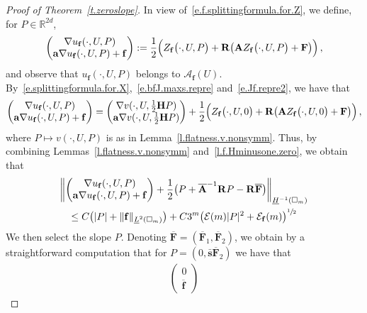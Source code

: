 \documentclass[11pt]{article} %
\let\oldsquare\square %
\renewcommand{\square}{\oldsquare}
\numberwithin{equation}{section}
\theoremstyle{definition}
\newcommand*{\R}{\ensuremath{\mathbb{R}}}
\newcommand{\f}{\mathbf{f}}
\renewcommand{\a}{\mathbf{a}}
\newcommand{\shom}{\bar{\mathbf{s}}}
\newcommand{\cu}{\square}
\newcommand{\bfA}{\mathbf{A}}
\newcommand{\bfF}{\mathbf{F}}
\newcommand{\rota}{\mathbf{R}}
\newcommand{\refl}{\mathbf{H}}
\begin{document}
\begin{proof}[{Proof of Theorem~\ref{t.zeroslope}}]
In view of~\eqref{e.f.splittingformula.for.Z}, we define, for $P\in \R^{2d}$, 
\begin{align*}  
\begin{pmatrix} \nabla u_\f(\cdot,U,P)  \\ \a \nabla u_\f(\cdot,U,P) + \f \end{pmatrix}  
:=
\frac12 \Bigl( Z_\f\bigl(\cdot,U,P \bigr) + \rota \bigl( \bfA Z_\f\bigl (\cdot,U,P \bigr) + \bfF\bigr) \Bigr) \,,
\end{align*}
and observe that $u_\f(\cdot,U,P)$ belongs to $\mathcal{A}_\f(U)$. By~\eqref{e.splittingformula.for.X},~\eqref{e.bfJ.maxs.repre} and~\eqref{e.Jf.repre2}, we have that
\begin{equation*}  
\begin{pmatrix} \nabla u_\f(\cdot,U,P)  \\ \a \nabla u_\f(\cdot,U,P) + \f \end{pmatrix}  
= 
\begin{pmatrix} \nabla v(\cdot,U,\frac12 \refl P)  \\ \a \nabla v(\cdot,U, \frac12 \refl P) \end{pmatrix}
+
\frac12 \Bigl( Z_\f\bigl(\cdot,U,0 \bigr) + \rota \bigl( \bfA Z_\f\bigl (\cdot,U,0 \bigr) + \bfF\bigr) \Bigr)   
\,,
\end{equation*}
where $P \mapsto v(\cdot,U,P)$ is as in Lemma~\ref{l.flatness.v.nonsymm}. Thus, by combining Lemmas~\ref{l.flatness.v.nonsymm} and~\ref{l.f.Hminusone.zero}, we obtain that 
\begin{multline*}  
\biggl\| \begin{pmatrix} \nabla u_\f(\cdot,U,P)  \\ \a \nabla u_\f(\cdot,U,P) + \f \end{pmatrix}    + \frac12 \bigr( P + \overline{\bfA}^{-1} \rota P -   \rota \overline{\bfF} \bigl)  \biggr\|_{\underline{H}^{-1}(\cu_m)} 
\\
\leq
C \bigl( |P|  + \| \f \|_{\underline{L}^2(\cu_m)} \bigr) + C 3^{m} \bigl(\mathcal{E}(m)|P|^2 + \mathcal{E}_\f(m)\bigr)^{\sfrac12} 
\end{multline*}
We then select the slope $P$. Denoting $\overline{\bfF}  = (\overline{\bfF}_1, \overline{\bfF}_2)$, we obtain by a straightforward computation that for $P = (0, \shom \overline{\bfF}_2)$  
we have that 
\begin{align*}  
\begin{pmatrix} 0  \\ \overline{\f} \end{pmatrix}  

\end{align*}
\end{proof}
\end{document}
